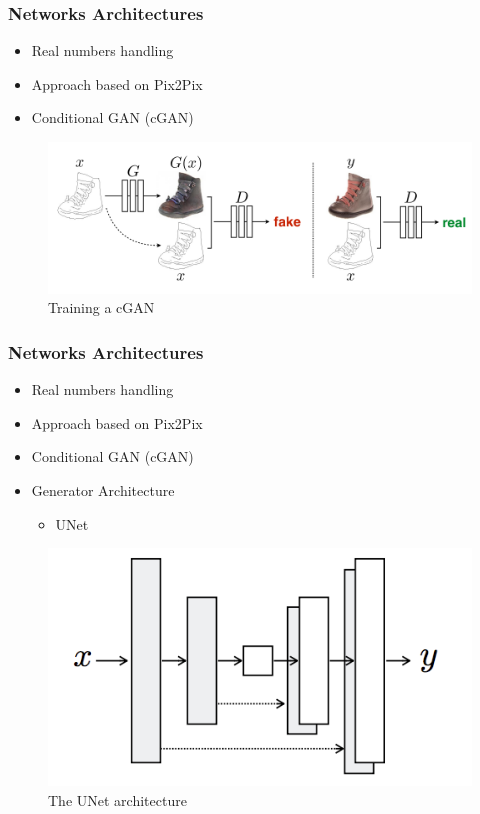 \documentclass[18pt, xcolor=table]{beamer}
\begin{document}
\begin{frame}[t]
  \frametitle{Networks Architectures}
  \begin{itemize}
  \item Real numbers handling
  \item Approach based on Pix2Pix
  \item Conditional GAN (cGAN)
  \end{itemize}
  \begin{center}
    \begin{figure}[htb]
      \includegraphics[scale=0.33]{images/pix2pix_cgan}
      \caption{Training a cGAN}
    \end{figure}
  \end{center}

\end{frame}


\begin{frame}[t]
  \frametitle{Networks Architectures}
  \begin{itemize}
  \item Real numbers handling
  \item Approach based on Pix2Pix
  \item Conditional GAN (cGAN)
  \item Generator Architecture
    \begin{itemize}
    \item UNet
    \end{itemize}
  \end{itemize}

  \begin{center}
    \begin{figure}[htb]
      \includegraphics[scale=0.33]{images/nets/unet}
      \caption{The UNet architecture}
    \end{figure}
  \end{center}

\end{frame}
\end{document}
